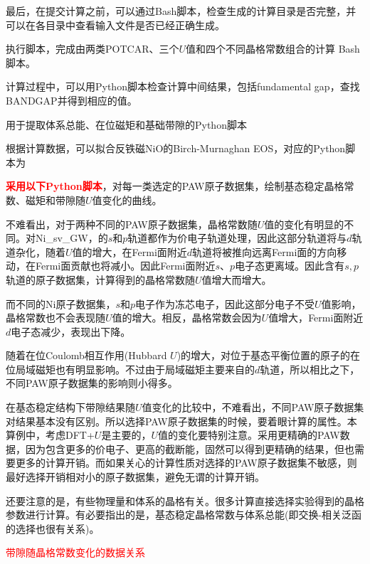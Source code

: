 最后，在提交计算之前，可以通过\textrm{Bash}脚本，检查生成的计算目录是否完整，并可以在各目录中查看输入文件是否已经正确生成。

执行脚本，完成由两类\textrm{POTCAR}、三个$U$值和四个不同晶格常数组合的计算
\textrm{Bash}脚本。

计算过程中，可以用\textrm{Python}脚本检查计算中间结果，包括\textrm{fundamental gap}，查找\textrm{BANDGAP}并得到相应的值。

用于提取体系总能、在位磁矩和基础带隙的\textrm{Python}脚本

根据计算数据，可以拟合反铁磁\textrm{NiO}的\textrm{Birch-Murnaghan EOS}，对应的\textrm{Python}脚本为

\textcolor{red}{\textbf{采用以下\textrm{Python}脚本}}，对每一类选定的\textrm{PAW}原子数据集，绘制基态稳定晶格常数、磁矩和带隙随$U$值变化的曲线。

不难看出，对于两种不同的\textrm{PAW}原子数据集，晶格常数随$U$值的变化有明显的不同。对\textrm{Ni\_sv\_GW}，的$s$和$p$轨道都作为价电子轨道处理，因此这部分轨道将与$d$轨道杂化，随着$U$值的增大，在\textrm{Fermi}面附近$d$轨道将被推向远离\textrm{Fermi}面的方向移动，在\textrm{Fermi}面贡献也将减小。因此\textrm{Fermi}面附近$s$、$p$电子态更离域。因此含有$s,p$轨道的原子数据集，计算得到的晶格常数随$U$值增大而增大。

而不同的\textrm{Ni}原子数据集，$s$和$p$电子作为冻芯电子，因此这部分电子不受$U$值影响，晶格常数也不会表现随$U$值的增大。相反，晶格常数会因为$U$值增大，\textrm{Fermi}面附近$d$电子态减少，表现出下降。

随着在位\textrm{Coulomb}相互作用\textrm{(Hubbard $U$)}的增大，对位于基态平衡位置的原子的在位局域磁矩也有明显影响。不过由于局域磁矩主要来自的$d$轨道，所以相比之下，不同\textrm{PAW}原子数据集的影响则小得多。

在基态稳定结构下带隙结果随$U$值变化的比较中，不难看出，不同\textrm{PAW}原子数据集对结果基本没有区别。所以选择\textrm{PAW}原子数据集的时候，要着眼计算的属性。本算例中，考虑\textrm{DFT}+$U$是主要的，$U$值的变化要特别注意。采用更精确的\textrm{PAW}数据，因为包含更多的价电子、更高的截断能，固然可以得到更精确的结果，但也需要更多的计算开销。而如果关心的计算性质对选择的\textrm{PAW}原子数据集不敏感，则最好选择开销相对小的原子数据集，避免无谓的计算开销。

还要注意的是，有些物理量和体系的晶格有关。很多计算直接选择实验得到的晶格参数进行计算。有必要指出的是，基态稳定晶格常数与体系总能(即交换-相关泛函的选择也很有关系)。

\textcolor{red}{带隙随晶格常数变化的数据关系}

